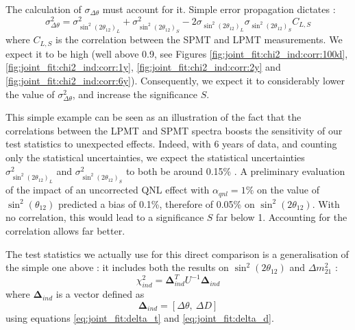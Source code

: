 \documentclass[../main.tex]{subfiles}
\begin{document}
The calculation of $\sigma_{\Delta \theta}$ must account for it. Simple error propagation dictates :
\begin{equation}
\sigma^2_{\Delta \theta} = \sigma^2_{\sin^2(2\theta_{12})_L} + \sigma^2_{\sin^2(2\theta_{12})_S} - 2\sigma_{\sin^2(2\theta_{12})_L}\sigma_{\sin^2(2\theta_{12})_S}C_{L,S}
\end{equation}
where $C_{L,S}$ is the correlation  between the SPMT and LPMT measurements. We expect it to be high (well above 0.9, see Figures \ref{fig:joint_fit:chi2_ind:corr:100d}, \ref{fig:joint_fit:chi2_ind:corr:1y}, \ref{fig:joint_fit:chi2_ind:corr:2y} and \ref{fig:joint_fit:chi2_ind:corr:6y}). Consequently, we expect it to considerably lower the value of $\sigma^2_{\Delta \theta}$, and increase the significance $S$.
\hfill

This simple example can be seen as an illustration of the fact that the correlations between the LPMT and SPMT spectra boosts the sensitivity of our test statistics to unexpected effects. Indeed, with 6 years of data, and counting only the statistical uncertainties, we expect the statistical uncertainties $\sigma^2_{\sin^2(2\theta_{12})_L}$ and $\sigma^2_{\sin^2(2\theta_{12})_S}$ to both be around 0.15\% \cites{juno_collaboration_sub-percent_2022}. A preliminary evaluation \cite{cabrera_multi-calorimetry_2023} of the impact of an uncorrected QNL effect with $\alpha_{qnl} = 1\%$ on the value of $\sin^2(\theta_{12})$ predicted a bias of 0.1\%, therefore of 0.05\% on $\sin^2(2\theta_{12})$. With no correlation, this would lead to a significance $S$ far below 1. Accounting for the correlation allows far better.

The test statistics we actually use for this direct comparison is a generalisation of the simple one above : it includes both the results on $\sin^2(2\theta_{12})$ and $\Delta m^2_{21}$ :
\begin{equation}
  \chi^2_{ind} = \bm{\Delta}_{ind}^T U^{-1} \bm{\Delta}_{ind}
\end{equation}
where $\bm{\Delta}_{ind}$ is a vector defined as
\begin{equation}
  \label{eq:joint_fit:ind:delta}
  \bm{\Delta}_{ind} = [ \Delta \theta, ~ \Delta D ]
\end{equation}
using equations \ref{eq:joint_fit:delta_t} and \ref{eq:joint_fit:delta_d}.
\end{document}
